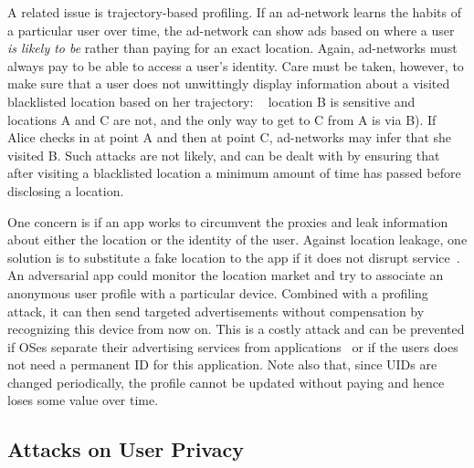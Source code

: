 
A related issue is trajectory-based profiling. If an ad-network learns the habits of a particular user over time, the ad-network can show ads based on where a user \emph{is likely to be} rather than paying for an exact location. Again, ad-networks must always pay to be able to access a user's identity. 
Care must be taken, however, to make sure that a user does not unwittingly display information about a visited blacklisted location based on her trajectory: \eg~ location B is sensitive and locations A and C are not, and the only way to get to C from A is via B). If Alice checks in at point A and then at point C, ad-networks may infer that she visited B. Such attacks are not likely, and can be dealt with by ensuring that after visiting a blacklisted location a minimum amount of time has passed before disclosing a location. 

One concern is if an app works to circumvent the proxies and leak information about either the location or the identity of the user. 
Against location leakage, one solution is to substitute a fake location to the app if it does not disrupt service~\cite{Hornyack:2011wq}.
An adversarial app could monitor the location market and try to associate an anonymous user profile with a particular device. Combined with a profiling attack, it can then send targeted advertisements without compensation by recognizing this device from now on. This is a costly attack and can be prevented if OSes separate their advertising services from applications~\cite{Leontiadis:2012} or if the users does not need a permanent ID for this application. Note also that, since UIDs are changed periodically, the profile cannot be updated without paying and hence loses some value over time.

\subsection{Attacks on User Privacy}
\label{sec:inference}

